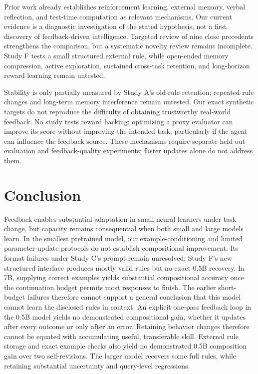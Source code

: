 \documentclass[11pt]{article}
\begin{document}
Prior work already establishes reinforcement learning, external memory,
verbal reflection, and test-time computation as relevant mechanisms. Our
current evidence is a diagnostic investigation of the stated hypothesis, not
a first discovery of feedback-driven intelligence. Targeted review of nine
close precedents strengthens the comparison, but a systematic novelty review
remains incomplete. Study F tests a small structured external rule, while
open-ended memory compression, active exploration, sustained cross-task
retention, and long-horizon reward learning remain untested.

Stability is only partially measured by Study A's old-rule retention; repeated
rule changes and long-term memory interference remain untested. Our exact
synthetic targets do not reproduce the difficulty of obtaining trustworthy
real-world feedback. No study tests reward hacking: optimizing a proxy evaluator
can improve its score without improving the intended task, particularly if the
agent can influence the feedback source. These mechanisms require separate
held-out evaluation and feedback-quality experiments; faster updates alone do
not address them.

\section{Conclusion}
Feedback enables substantial adaptation in small neural learners under task
change, but capacity remains consequential when both small and large models
learn. In the smallest pretrained model, our example-conditioning and limited
parameter-update protocols do not establish compositional improvement. Its
format failures under Study C's prompt remain unresolved; Study F's new
structured interface produces mostly valid rules but no exact 0.5B recovery.
In 7B, supplying correct examples yields
substantial compositional accuracy once the continuation budget permits most
responses to finish. The earlier short-budget failures therefore cannot support
a general conclusion that this model cannot learn the disclosed rules in context.
An explicit one-pass feedback loop in the 0.5B model yields no demonstrated
compositional gain, whether it updates after every outcome or only after an
error. Retaining behavior changes therefore cannot be equated with accumulating
useful, transferable skill. External rule storage and exact example checks
also yield no demonstrated 0.5B composition gain over two self-revisions.
The larger model recovers some full rules, while retaining substantial
uncertainty and query-level regressions.
\end{document}
